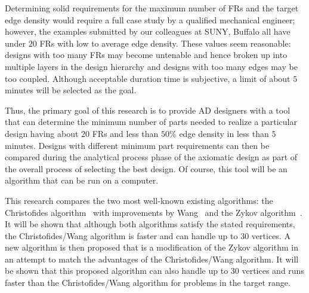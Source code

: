 Determining solid requirements for the maximum number of FRs and the target edge density would require a full case
study by a qualified mechanical engineer; however, the examples submitted by our colleagues at SUNY, Buffalo all
have under \(20\) FRs with low to average edge density.  These values seem reasonable: designs with too many FRs
may become untenable and hence broken up into multiple layers in the design hierarchy and designs with too many
edges may be too coupled.  Although acceptable duration time is subjective, a limit of about \(5\) minutes will be
selected as the goal.

Thus, the primary goal of this research is to provide AD designers with a tool that can determine the minimum
number of parts needed to realize a particular design having about \(20\) FRs and less than \(50\%\) edge density
in less than \(5\) minutes.  Designs with different minimum part requirements can then be compared during the
analytical process phase of the axiomatic design as part of the overall process of selecting the best design.  Of
course, this tool will be an algorithm that can be run on a computer.

This research compares the two most well-known existing algorithms: the Christofides algorithm~\cite{christofides}
with improvements by Wang~\cite{wang} and the Zykov algorithm~\cite{corneil}.  It will be shown that although both
algorithms satisfy the stated requirements, the Christofides/Wang algorithm is faster and can handle up to \(30\)
vertices.  A new algorithm is then proposed that is a modification of the Zykov algorithm in an attempt to match
the advantages of the Christofides/Wang algorithm.  It will be shown that this proposed algorithm can also handle
up to \(30\) vertices and runs faster than the Christofides/Wang algorithm for problems in the target range.

